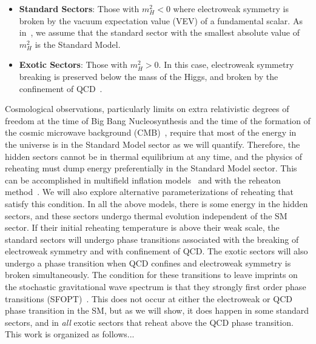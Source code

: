 \documentclass[nofootinbib,twocolumn,preprintnumbers]{revtex4-1}
\begin{document}
\begin{itemize}
\item \textbf{Standard Sectors}: Those with $m_H^2 < 0$ where electroweak symmetry is broken by the vacuum expectation value (VEV) of a fundamental scalar. As in~\cite{Arkani-Hamed:2016rle}, we assume that the standard sector with the smallest absolute value of $m_H^2$ is the Standard Model.
\item \textbf{Exotic Sectors}: Those with  $m_H^2 > 0$. In this case, electroweak symmetry breaking is preserved below the mass of the Higgs, and broken by the confinement of QCD~\cite{Arkani-Hamed:2016rle,Pisarski:1983ms}.
\end{itemize}
Cosmological observations, particularly limits on extra relativistic degrees of freedom at the time of Big Bang Nucleosynthesis and the time of the formation of the cosmic microwave background (CMB)~\cite{Aghanim:2018eyx}, require that most of the energy in the universe is in the Standard Model sector as we will quantify. Therefore, the hidden sectors cannot be in thermal equilibrium at any time, and the physics of reheating must dump energy preferentially in the Standard Model sector. This can be accomplished in multifield inflation models~\cite{} and with the reheaton method~\cite{Arkani-Hamed:2016rle}. We will also explore alternative parameterizations of reheating that satisfy this condition.
In all the above models, there is some energy in the hidden sectors, and these sectors undergo thermal evolution independent of the SM sector. If their initial reheating temperature is above their weak scale, the standard sectors will undergo phase transitions associated with the breaking of electroweak symmetry and with confinement of QCD. The exotic sectors will also undergo a phase transition when QCD confines and electroweak symmetry is broken simultaneously. The condition for these transitions to leave imprints on the stochastic gravitational wave spectrum is that they strongly first order phase transitions (SFOPT)~\cite{Witten:1984rs,Hogan:1984hx,Hogan:1986qda,PhysRevLett.65.3080}. This does not occur at either the electroweak or QCD phase transition in the SM, but as we will show, it does happen in some standard sectors, and in \textit{all} exotic sectors that reheat above the QCD phase transition. 
This work is organized as follows...
 
\end{document}
